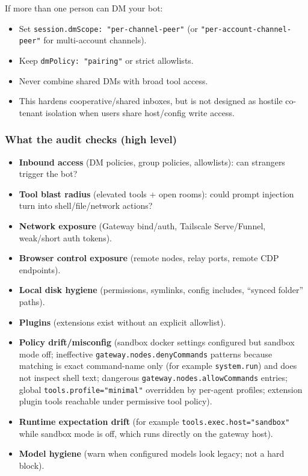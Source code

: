 If more than one person can DM your bot:

\begin{itemize}
  \item Set \texttt{session.dmScope: "per-channel-peer"} (or \texttt{"per-account-channel-peer"} for multi-account channels).
  \item Keep \texttt{dmPolicy: "pairing"} or strict allowlists.
  \item Never combine shared DMs with broad tool access.
  \item This hardens cooperative/shared inboxes, but is not designed as hostile co-tenant isolation when users share host/config write access.
\end{itemize}


\subsubsection{What the audit checks (high level)}


\begin{itemize}
  \item \textbf{Inbound access} (DM policies, group policies, allowlists): can strangers trigger the bot?
  \item \textbf{Tool blast radius} (elevated tools + open rooms): could prompt injection turn into shell/file/network actions?
  \item \textbf{Network exposure} (Gateway bind/auth, Tailscale Serve/Funnel, weak/short auth tokens).
  \item \textbf{Browser control exposure} (remote nodes, relay ports, remote CDP endpoints).
  \item \textbf{Local disk hygiene} (permissions, symlinks, config includes, “synced folder” paths).
  \item \textbf{Plugins} (extensions exist without an explicit allowlist).
  \item \textbf{Policy drift/misconfig} (sandbox docker settings configured but sandbox mode off; ineffective \texttt{gateway.nodes.denyCommands} patterns because matching is exact command-name only (for example \texttt{system.run}) and does not inspect shell text; dangerous \texttt{gateway.nodes.allowCommands} entries; global \texttt{tools.profile="minimal"} overridden by per-agent profiles; extension plugin tools reachable under permissive tool policy).
  \item \textbf{Runtime expectation drift} (for example \texttt{tools.exec.host="sandbox"} while sandbox mode is off, which runs directly on the gateway host).
  \item \textbf{Model hygiene} (warn when configured models look legacy; not a hard block).
\end{itemize}


